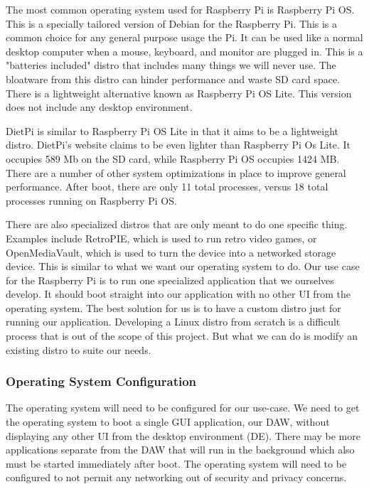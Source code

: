 The most common operating system used for Raspberry Pi is Raspberry Pi OS. This is a
specially tailored version of Debian for the Raspberry Pi. This is a common choice for any
general purpose usage the Pi. It can be used like a normal desktop computer when a mouse,
keyboard, and monitor are plugged in. This is a "batteries included" distro that includes
many things we will never use. The bloatware from this distro can hinder performance and
waste SD card space. There is a lightweight alternative known as Raspberry Pi OS Lite.
This version does not include any desktop environment.

DietPi is similar to Raspberry Pi OS Lite in that it aims to be a lightweight distro.
DietPi's website claims to be even lighter than Raspberry Pi Os Lite. It occupies 589 Mb
on the SD card, while Raspberry Pi OS occupies 1424 MB. There are a number of other system
optimizations in place to improve general performance. After boot, there are only 11 total
processes, versus 18 total processes running on Raspberry Pi OS.

There are also specialized distros that are only meant to do one specific thing. Examples
include RetroPIE, which is used to run retro video games, or OpenMediaVault, which is used
to turn the device into a networked storage device. This is similar to what we want our
operating system to do. Our use case for the Raspberry Pi is to run one specialized
application that we ourselves develop. It should boot straight into our application with
no other UI from the operating system. The best solution for us is to have a custom distro
just for running our application. Developing a Linux distro from scratch is a difficult
process that is out of the scope of this project. But what we can do is modify an existing
distro to suite our needs.

\subsubsection{Operating System Configuration}
\label{sec:research:subsec:os_config}

The operating system will need to be configured for our use-case. We need to get the
operating system to boot a single GUI application, our DAW, without displaying any other
UI from the desktop environment (DE). There may be more applications separate from the DAW
that will run in the background which also must be started immediately after boot. The
operating system will need to be configured to not permit any networking out of security
and privacy concerns.

